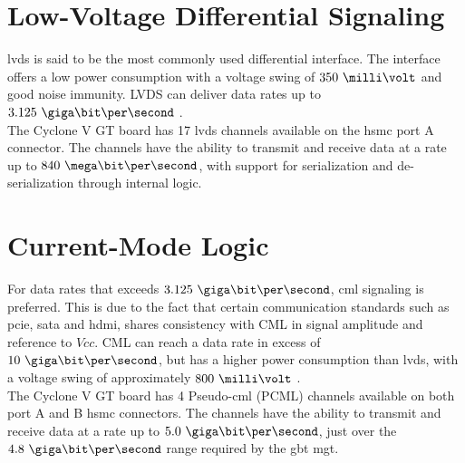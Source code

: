 \documentclass[main.tex]{subfiles}
\begin{document}
\section{Low-Voltage Differential Signaling} \label{sec:lvds}

\gls{lvds} is said to be the most commonly used differential interface. The interface offers a low power consumption with a voltage swing of $350\ \milli\volt$ and good noise immunity. LVDS can deliver data rates up to $3.125\ \giga\bit\per\second$ \cite{ti08lvds}.\\

The Cyclone V GT board has 17 \gls{lvds} channels available on the \gls{hsmc} port A connector. The channels have the ability to transmit and receive data at a rate up to $840\ \mega\bit\per\second$, with support for serialization and de-serialization through internal logic. \cite{altera_cvoverview15}

\section{Current-Mode Logic}

For data rates that exceeds $3.125\ \giga\bit\per\second$, \gls{cml} signaling is preferred. This is due to the fact that certain communication standards such as \acrshort{pcie}, \acrshort{sata} and \acrshort{hdmi}, shares consistency with CML in signal amplitude and reference to $Vcc$. CML can reach a data rate in excess of $10\ \giga\bit\per\second$, but has a higher power consumption than \gls{lvds}, with a voltage swing of approximately $800\ \milli\volt$ \cite{ti08lvds}.\\

The Cyclone V GT board has 4 Pseudo-\gls{cml} (PCML) channels available on both port A and B \gls{hsmc} connectors. The channels have the ability to transmit and receive data at a rate up to $5.0\ \giga\bit\per\second$, just over the $4.8\ \giga\bit\per\second$ range required by the \gls{gbt} \gls{mgt}. \cite{altera_cyclonekit}




\end{document}
